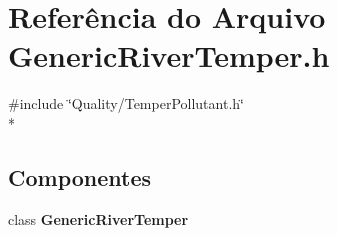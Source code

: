 \section{Referência do Arquivo Generic\+River\+Temper.\+h}
\label{_generic_river_temper_8h}
{\ttfamily \#include \char`\"{}Quality/\+Temper\+Pollutant.\+h\char`\"{}}\\*
\subsection*{Componentes}
\begin{DoxyCompactItemize}
\item 
class {\bf Generic\+River\+Temper}
\end{DoxyCompactItemize}
